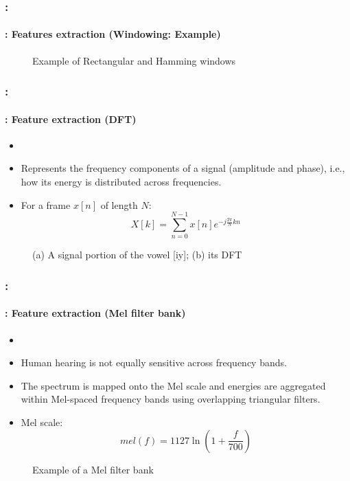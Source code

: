 \documentclass[xcolor=table]{beamer}
\begin{document}
\begin{frame}
	\frametitle{\insertshortsubtitle: \insertsection}
	\framesubtitle{\insertsubsection: Features extraction (Windowing: Example)}
	
	\begin{figure}
		\centering
		\caption{Example of Rectangular and Hamming windows \cite{2020-jurafsky-martin}}
	\end{figure}
	
\end{frame}

\begin{frame}
	\frametitle{\insertshortsubtitle: \insertsection}
	\framesubtitle{\insertsubsection: Feature extraction (DFT)}
	
	\begin{itemize}
		\item {}
		\item Represents the frequency components of a signal (amplitude and phase), i.e., how its energy is distributed across frequencies.
		\item For a frame $x[n]$ of length $N$:
		\[
		X[k] = \sum_{n=0}^{N-1} x[n] e^{-j\frac{2\pi}{N}kn}
		\]
	\end{itemize}
	\vspace{-6pt}
	\begin{figure}
		\centering
		\caption{(a) A signal portion of the vowel [iy]; (b) its DFT \cite{2020-jurafsky-martin}}
	\end{figure}
	
\end{frame}

\begin{frame}
	\frametitle{\insertshortsubtitle: \insertsection}
	\framesubtitle{\insertsubsection: Feature extraction (Mel filter bank)}
	
	\begin{itemize}
		\item {}
		\item Human hearing is not equally sensitive across frequency bands.
		\item The spectrum is mapped onto the Mel scale and energies are aggregated within Mel-spaced frequency bands using overlapping triangular filters.
		\item Mel scale:
		\[
		mel(f) = 1127 \ln \left(1 + \frac{f}{700}\right)
		\]
	\end{itemize}
	\vspace{-6pt}
	\begin{figure}
		\centering
		\caption{Example of a Mel filter bank \cite{2020-jurafsky-martin}}
	\end{figure}
	
\end{frame}
\end{document}
